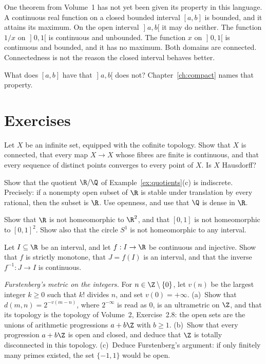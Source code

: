 One theorem from Volume~1 has not yet been given its property in this language. A continuous real function on a closed bounded interval $[a,b]$ is bounded, and it attains its maximum. On the open interval $\mathopen]a,b[$ it may do neither. The function $1/x$ on $\mathopen]0,1[$ is continuous and unbounded. The function $x$ on $\mathopen]0,1[$ is continuous and bounded, and it has no maximum. Both domains are connected. Connectedness is not the reason the closed interval behaves better.

What does $[a,b]$ have that $\mathopen]a,b[$ does not? Chapter~\ref{ch:compact} names that property.

\section{Exercises}

\begin{exercise}[$\star$]\label{ex:cofinite}
Let $X$ be an infinite set, equipped with the cofinite topology. Show that $X$ is connected, that every map $X\to X$ whose fibres are finite is continuous, and that every sequence of distinct points converges to every point of $X$. Is $X$ Hausdorff?
\end{exercise}

\begin{exercise}[$\star$]\label{ex:RmodQ}
Show that the quotient $\R/\Q$ of Example~\ref{ex:quotients}(c) is indiscrete. Precisely: if a nonempty open subset of $\R$ is stable under translation by every rational, then the subset is $\R$. Use openness, and use that $\Q$ is dense in $\R$.
\end{exercise}

\begin{exercise}[$\star\star$]\label{ex:notR2}
Show that $\R$ is not homeomorphic to $\R^2$, and that $[0,1]$ is not homeomorphic to $[0,1]^2$. Show also that the circle $S^1$ is not homeomorphic to any interval.
\end{exercise}

\begin{exercise}[$\star\star$]\label{ex:monotone}
Let $I\subseteq\R$ be an interval, and let $f:I\to\R$ be continuous and injective. Show that $f$ is strictly monotone, that $J=f(I)$ is an interval, and that the inverse $f^{-1}:J\to I$ is continuous.
\end{exercise}

\begin{exercise}[$\star\star$]\label{ex:furstenberg}
\emph{Furstenberg's metric on the integers.} For $n\in\Z\setminus\{0\}$, let $v(n)$ be the largest integer $k\ge0$ such that $k!$ divides $n$, and set $v(0)=+\infty$. (a)~Show that $d(m,n)=2^{-v(m-n)}$, where $2^{-\infty}$ is read as $0$, is an ultrametric on $\Z$, and that its topology is the topology of Volume~2, Exercise~2.8: the open sets are the unions of arithmetic progressions $a+b\Z$ with $b\ge1$. (b)~Show that every progression $a+b\Z$ is open and closed, and deduce that $\Z$ is totally disconnected in this topology. (c)~Deduce Furstenberg's argument: if only finitely many primes existed, the set $\{-1,1\}$ would be open.
\end{exercise}


